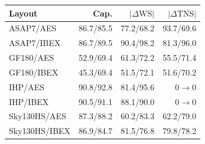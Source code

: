 \begin{tabular*}{\columnwidth}{@{\extracolsep{\fill}}lrrr@{}}
\toprule
Layout & Cap. & $|\Delta\mathrm{WS}|$ & $|\Delta\mathrm{TNS}|$ \\
\midrule
ASAP7/AES & 86.7/85.5 & 77.2/68.2 & 93.7/69.6 \\
ASAP7/IBEX & 86.7/89.5 & 90.4/98.2 & 81.3/96.0 \\
GF180/AES & 52.9/69.4 & 61.3/72.2 & 55.5/71.4 \\
GF180/IBEX & 45.3/69.4 & 51.5/72.1 & 51.6/70.2 \\
IHP/AES & 90.8/92.8 & 81.4/95.6 & $0\!\to\!0$ \\
IHP/IBEX & 90.5/91.1 & 88.1/90.0 & $0\!\to\!0$ \\
Sky130HS/AES & 87.3/88.2 & 60.2/83.3 & 62.2/79.0 \\
Sky130HS/IBEX & 86.9/84.7 & 81.5/76.8 & 79.8/78.2 \\
\bottomrule
\end{tabular*}

